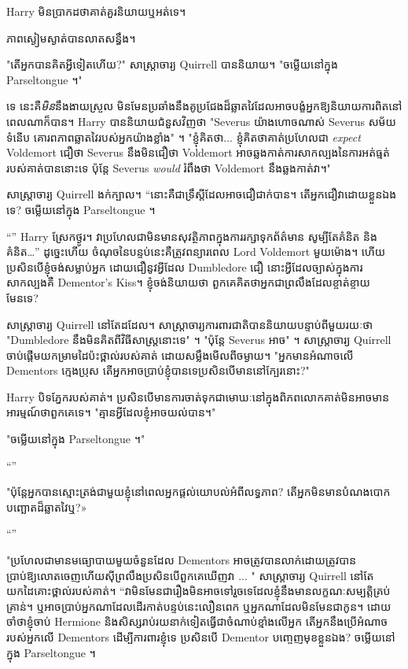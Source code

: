 Harry មិន​ប្រាកដ​ថា​គាត់​គួរ​និយាយ​ឬ​អត់​ទេ។

ភាពស្ងៀមស្ងាត់បានលាតសន្ធឹង។

"តើអ្នកបានគិតអ្វីទៀតហើយ?" សាស្ត្រាចារ្យ Quirrell បាននិយាយ។ "ចម្លើយនៅក្នុង Parseltongue ។"

ទេ នេះគឺ\emph{មិន}នឹងងាយស្រួល មិនមែនប្រឆាំងនឹងគូប្រជែងដ៏ឆ្លាតវៃដែលអាចបង្ខំអ្នកឱ្យនិយាយការពិតនៅពេលណាក៏បាន។ Harry បាននិយាយជំនួសវិញថា "Severus យ៉ាងហោចណាស់ Severus សម័យទំនើប គោរពភាពឆ្លាតវៃរបស់អ្នកយ៉ាងខ្លាំង" ។ "ខ្ញុំគិតថា... ខ្ញុំគិតថាគាត់ប្រហែលជា \emph{expect} Voldemort ជឿថា Severus នឹងមិនជឿថា Voldemort អាចឆ្លងកាត់ការសាកល្បងនៃការអត់ធ្មត់របស់គាត់បាននោះទេ ប៉ុន្តែ Severus \emph{would} រំពឹងថា Voldemort នឹងឆ្លងកាត់វា។"

សាស្ត្រាចារ្យ Quirrell ងក់ក្បាល។ “នោះគឺជាទ្រឹស្តីដែលអាចជឿជាក់បាន។ តើអ្នកជឿវាដោយខ្លួនឯងទេ? ចម្លើយនៅក្នុង Parseltongue ។

“” Harry ស្រែកថ្ងូរ។ វាប្រហែលជាមិនមានសុវត្ថិភាពក្នុងការរក្សាទុកព័ត៌មាន សូម្បីតែគំនិត និងគំនិត…” ដូច្នេះហើយ ចំណុចនៃបន្ទប់នេះគឺត្រូវពន្យារពេល Lord Voldemort មួយម៉ោង។ ហើយប្រសិនបើខ្ញុំចង់សម្លាប់អ្នក ដោយជឿនូវអ្វីដែល Dumbledore ជឿ នោះអ្វីដែលច្បាស់ក្នុងការសាកល្បងគឺ Dementor's Kiss។ ខ្ញុំចង់និយាយថា ពួកគេគិតថាអ្នកជាព្រលឹងដែលខ្ចាត់ខ្ចាយ មែនទេ?

សាស្រ្តាចារ្យ Quirrell នៅតែដដែល។ សាស្ត្រាចារ្យការពារជាតិបាននិយាយបន្ទាប់ពីមួយរយៈថា "Dumbledore នឹងមិនគិតពីវិធីសាស្រ្តនោះទេ" ។ "ប៉ុន្តែ Severus អាច" ។ សាស្ត្រាចារ្យ Quirrell ចាប់ផ្តើមយកម្រាមដៃប៉ះថ្ពាល់របស់គាត់ ដោយសម្លឹងមើលពីចម្ងាយ។ "អ្នកមានអំណាចលើ Dementors ក្មេងប្រុស តើអ្នកអាចប្រាប់ខ្ញុំបានទេប្រសិនបើមាននៅក្បែរនោះ?"

Harry បិទភ្នែករបស់គាត់។ ប្រសិនបើមានការចាត់ទុកជាមោឃៈនៅក្នុងពិភពលោកគាត់មិនអាចមានអារម្មណ៍ថាពួកគេទេ។ "គ្មាន​អ្វី​ដែល​ខ្ញុំ​អាច​យល់​បាន។"

"ចម្លើយនៅក្នុង Parseltongue ។"

“”

"ប៉ុន្តែអ្នកបានស្មោះត្រង់ជាមួយខ្ញុំនៅពេលអ្នកផ្តល់យោបល់អំពីលទ្ធភាព? តើ​អ្នក​មិន​មាន​បំណង​បោក​បញ្ឆោត​ដ៏​ឆ្លាត​វៃ​ឬ?»

“”

"ប្រហែលជាមានមធ្យោបាយមួយចំនួនដែល Dementors អាចត្រូវបានលាក់ដោយត្រូវបានប្រាប់ឱ្យលោតចេញហើយស៊ីព្រលឹងប្រសិនបើពួកគេឃើញវា ... " សាស្ត្រាចារ្យ Quirrell នៅតែយកដៃគោះថ្ពាល់របស់គាត់។ “វា​មិន​មែន​ជា​រឿង​មិន​អាច​ទៅ​រួច​ទេ​ដែល​ខ្ញុំ​នឹង​មាន​លក្ខណៈសម្បត្តិ​គ្រប់គ្រាន់។ ឬ​អាច​ប្រាប់​អ្នក​ណា​ដែល​ដើរ​កាត់​បន្ទប់​នេះ​លឿន​ពេក ឬ​អ្នក​ណា​ដែល​មិន​មែន​ជា​កូន។ ដោយចាំថាខ្ញុំចាប់ Hermione និងសិស្សរាប់រយនាក់ទៀតធ្វើជាចំណាប់ខ្មាំងលើអ្នក តើអ្នកនឹងប្រើអំណាចរបស់អ្នកលើ Dementors ដើម្បីការពារខ្ញុំទេ ប្រសិនបើ Dementor បញ្ចេញមុខខ្លួនឯង? ចម្លើយនៅក្នុង Parseltongue ។

